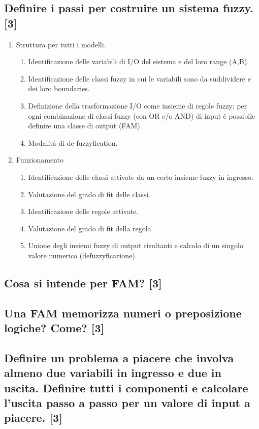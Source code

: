 \documentclass[\main/main.tex]{subfiles}
\begin{document}
\subsection{Definire i passi per costruire un sistema fuzzy. [3]}
\begin{enumerate}
  \item Struttura per tutti i modelli.
        \begin{enumerate}
          \item Identificazione delle variabili di I/O del sistema e del loro range (A,B).
          \item Identificazione delle classi fuzzy in cui le variabili sono da suddividere e dei loro boundaries.
          \item Definizione della trasformazione I/O come insieme di regole fuzzy: per ogni combinazione di classi fuzzy (con OR e/o AND) di input è possibile definire una classe di output (FAM).
          \item Modalità di de-fuzzyfication.
        \end{enumerate}
  \item Funzionamento
        \begin{enumerate}
          \item Identificazione delle classi attivate da un certo insieme fuzzy in ingresso.
          \item Valutazione del grado di fit delle classi.
          \item Identificazione delle regole attivate.
          \item Valutazione del grado di fit della regola.
          \item Unione degli insiemi fuzzy di output risultanti e calcolo di un singolo valore numerico (defuzzyficazione).
        \end{enumerate}
\end{enumerate}
\subsection{Cosa si intende per FAM? [3]}
\subsection{Una FAM memorizza numeri o preposizione logiche? Come? [3]}
\subsection{Definire un problema a piacere che involva almeno due variabili in ingresso e due in uscita. Definire tutti i componenti e calcolare l'uscita passo a passo per un valore di input a piacere. [3]}
\end{document}
